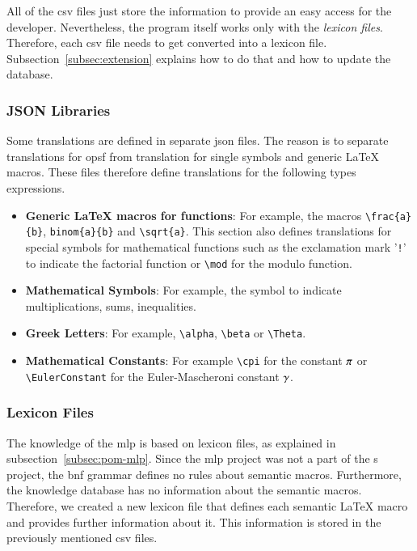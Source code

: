All of the \gls{csv} files just store the information to provide an easy access for the developer. Nevertheless, the program itself works only with the \textit{lexicon files}. Therefore, each \gls{csv} file needs to get converted into a lexicon file. Subsection~\ref{subsec:extension} explains how to do that and how to update the database.

\subsubsection{JSON Libraries}
Some translations are defined in separate \gls{json} files. The reason is to separate translations for \gls{opsf} from translation for single symbols and generic \LaTeX{} macros. These files therefore define translations for the following types expressions.

\begin{itemize}
\item \textbf{Generic \LaTeX{} macros for functions}:\newline 
For example, the macros \verb|\frac{a}{b}|, \texttt{\tbs binom\{a\}\{b\}} and \verb|\sqrt{a}|. This section also defines translations for special symbols for mathematical functions such as the exclamation mark '\verb|!|' to indicate the factorial function or \verb|\mod| for the modulo function.
\item \textbf{Mathematical Symbols}:\newline 
For example, the symbol to indicate multiplications, sums, inequalities.
\item \textbf{Greek Letters}:\newline 
For example, \verb|\alpha|, \verb|\beta| or \verb|\Theta|.
\item \textbf{Mathematical Constants}:\newline 
For example \verb|\cpi| for the constant ${\pi}$ or \verb|\EulerConstant| for the Euler-Mascheroni constant ${\gamma}$.
\end{itemize}

\subsubsection{Lexicon Files}
The knowledge of the \gls{mlp} is based on lexicon files, as explained in subsection~\ref{subsec:pom-mlp}. Since the \gls{mlp} project was not a part of the \Macro s project, the \gls{bnf} grammar defines no rules about semantic macros. Furthermore, the knowledge database has no information about the semantic macros. Therefore, we created a new lexicon file that defines each semantic \LaTeX{} macro and provides further information about it. This information is stored in the previously mentioned \gls{csv} files.

